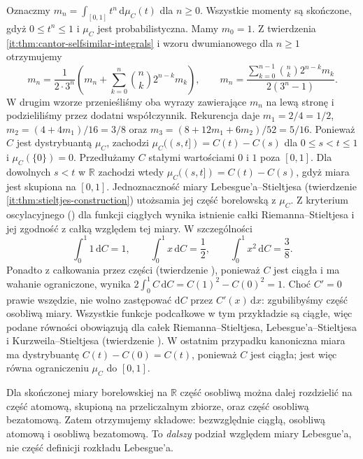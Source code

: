 \begin{przyklad}
\label{it:ex:cantor-moments}
Oznaczmy $m_n=\int_{[0,1]}t^n\,\mathrm d\mu_C(t)$
dla $n\ge0$. Wszystkie momenty są skończone, gdyż
$0\le t^n\le1$ i $\mu_C$ jest probabilistyczna.
Mamy $m_0=1$. Z twierdzenia
\ref{it:thm:cantor-selfsimilar-integrals} i wzoru dwumianowego
dla $n\ge1$ otrzymujemy
\[
 m_n=\frac{1}{2\cdot3^n}
       \left(m_n+\sum_{k=0}^n\binom{n}{k}2^{n-k}m_k\right),
 \qquad
 m_n=\frac{\sum_{k=0}^{n-1}\binom{n}{k}2^{n-k}m_k}
               {2(3^n-1)}.
\]
W drugim wzorze przenieśliśmy oba wyrazy zawierające
$m_n$ na lewą stronę i podzieliliśmy przez dodatni
współczynnik. Rekurencja daje $m_1=2/4=1/2$,
$m_2=(4+4m_1)/16=3/8$ oraz
$m_3=(8+12m_1+6m_2)/52=5/16$.
Ponieważ $C$ jest dystrybuantą $\mu_C$, zachodzi
$\mu_C((s,t])=C(t)-C(s)$ dla $0\le s<t\le1$ i $\mu_C(\{0\})=0$.
Przedłużamy $C$ stałymi wartościami $0$ i $1$ poza $[0,1]$.
Dla dowolnych $s<t$ w $\mathbb R$ zachodzi wtedy
$\mu_C((s,t])=C(t)-C(s)$, gdyż miara jest skupiona na $[0,1]$.
Jednoznaczność miary Lebesgue'a--Stieltjesa
(twierdzenie \ref{it:thm:stieltjes-construction}) utożsamia
jej część borelowską z $\mu_C$. Z kryterium oscylacyjnego
() dla funkcji
ciągłych wynika istnienie całki Riemanna--Stieltjesa i jej
zgodność z całką względem tej miary.
W szczególności
\[
\int_0^1 1\,\mathrm dC=1,\qquad \int_0^1 x\,\mathrm dC=\frac12,\qquad \int_0^1 x^2\,\mathrm dC=\frac38.
\]
Ponadto z całkowania przez części (twierdzenie ), ponieważ $C$ jest ciągła i ma wahanie ograniczone, wynika $2\int_0^1 C\,\mathrm dC=C(1)^2-C(0)^2=1$. Choć $C'=0$ prawie wszędzie, nie wolno zastępować $\mathrm dC$ przez $C'(x)\,\mathrm dx$: zgubilibyśmy część osobliwą miary. Wszystkie funkcje podcałkowe w tym przykładzie są
ciągłe, więc podane równości obowiązują dla całek
Riemanna--Stieltjesa, Lebesgue'a--Stieltjesa i
Kurzweila--Stieltjesa (twierdzenie ).
W ostatnim przypadku kanoniczna miara ma dystrybuantę
$C(t)-C(0)=C(t)$, ponieważ $C$ jest ciągła; jest więc
równa ograniczeniu $\mu_C$ do $[0,1]$.
\end{przyklad}


\begin{uwaga}
Dla skończonej miary borelowskiej na $\mathbb R$ część
osobliwą można dalej rozdzielić na część atomową,
skupioną na przeliczalnym zbiorze, oraz część osobliwą
bezatomową. Zatem otrzymujemy składowe: bezwzględnie
ciągłą, osobliwą atomową i osobliwą bezatomową.
To \emph{dalszy} podział względem miary Lebesgue'a,
nie część definicji rozkładu Lebesgue'a.
\end{uwaga}

